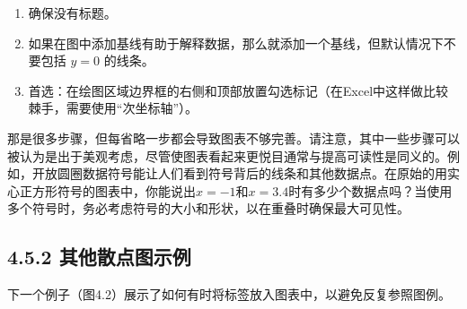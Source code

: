 \begin{enumerate}
\item 确保没有标题。

\item 如果在图中添加基线有助于解释数据，那么就添加一个基线，但默认情况下不要包括 $y=0$ 的线条。

\item 首选：在绘图区域边界框的右侧和顶部放置勾选标记（在Excel中这样做比较棘手，需要使用“次坐标轴”）。

\end{enumerate}

那是很多步骤，但每省略一步都会导致图表不够完善。请注意，其中一些步骤可以被认为是出于美观考虑，尽管使图表看起来更悦目通常与提高可读性是同义的。例如，开放圆圈数据符号能让人们看到符号背后的线条和其他数据点。在原始的用实心正方形符号的图表中，你能说出$x=-1$和$x=3.4$时有多少个数据点吗？当使用多个符号时，务必考虑符号的大小和形状，以在重叠时确保最大可见性。

\subsection*{4.5.2 其他散点图示例}
下一个例子（图4.2）展示了如何有时将标签放入图表中，以避免反复参照图例。


